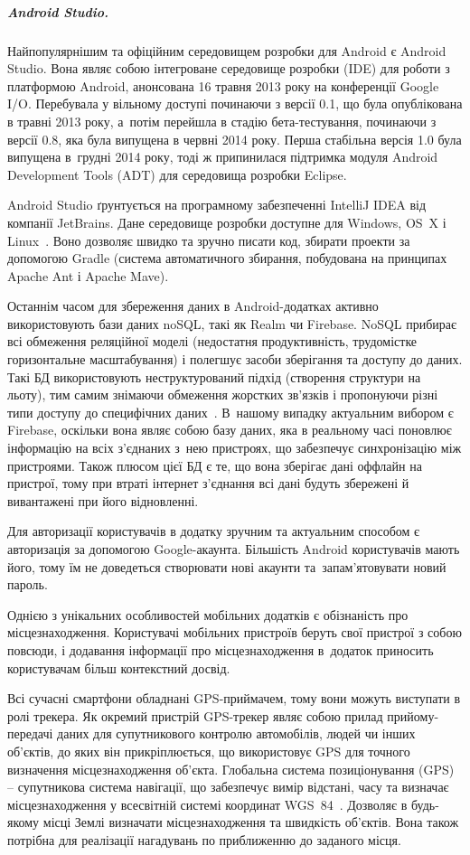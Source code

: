 \documentclass[../main.tex]{subfiles}
\begin{document}
\subparagraph{Android Studio.}
Найпопулярнішим та офіційним середовищем розробки для Android є Android Studio. Вона являє собою інтегроване середовище розробки (IDE) для роботи з платформою Android, анонсована 16 травня 2013 року на конференції Google I/O. Перебувала у вільному доступі починаючи з версії 0.1, що була опублікована в травні 2013 року, а~потім перейшла в стадію бета-тестування, починаючи з версії 0.8, яка була випущена в червні 2014 року. Перша стабільна версія 1.0 була випущена в~грудні 2014 року, тоді ж припинилася підтримка модуля Android Development Tools (ADT) для середовища розробки Eclipse.

Android Studio ґрунтується на програмному забезпеченні IntelliJ IDEA від компанії JetBrains. Дане середовище розробки доступне для Windows, OS~X і Linux~\cite{android_studio}. Воно дозволяє швидко та зручно писати код, збирати проекти за допомогою Gradle (система автоматичного збирання, побудована на принципах Apache Ant і Apache Mave).

Останнім часом для збереження даних в Android-додатках активно використовують бази даних noSQL, такі як Realm чи Firebase. NoSQL прибирає всі обмеження реляційної моделі (недостатня продуктивність, трудомістке горизонтальне масштабування) і полегшує засоби зберігання та доступу до даних. Такі БД використовують неструктурований підхід (створення структури на льоту), тим самим знімаючи обмеження жорстких зв'язків і пропонуючи різні типи доступу до специфічних даних~\cite{nosql}. В~нашому випадку актуальним вибором є Firebase, оскільки вона являє собою базу даних, яка в реальному часі поновлює інформацію на всіх з'єднаних з~нею пристроях, що забезпечує синхронізацію між пристроями. Також плюсом цієї БД є те, що вона зберігає дані оффлайн на пристрої, тому при втраті інтернет з'єднання всі дані будуть збережені й вивантажені при його відновленні.

Для авторизації користувачів в додатку зручним та актуальним способом є авторизація за допомогою Google-акаунта. Більшість Android користувачів мають його, тому їм не доведеться створювати нові акаунти та~запам'ятовувати новий пароль.

Однією з унікальних особливостей мобільних додатків є обізнаність про місцезнаходження. Користувачі мобільних пристроїв беруть свої пристрої з собою повсюди, і додавання інформації про місцезнаходження в~додаток приносить користувачам більш контекстний досвід. 

Всі сучасні смартфони обладнані GPS-приймачем, тому вони можуть виступати в ролі трекера.  Як окремий пристрій GPS-трекер являє собою прилад прийому-передачі даних для супутникового контролю автомобілів, людей чи інших об'єктів, до яких він прикріплюється, що використовує GPS для точного визначення місцезнаходження об'єкта. Глобальна система позиціонування (GPS) – супутникова система навігації, що забезпечує вимір відстані, часу та визначає місцезнаходження у всесвітній системі координат WGS~84~\cite{gps}. Дозволяє в будь-якому місці Землі визначати місцезнаходження та швидкість об'єктів. Вона також потрібна для реалізації нагадувань по приближенню до заданого місця.
\end{document}
